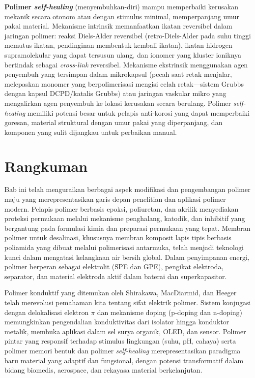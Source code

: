 \documentclass[12pt,a4paper,openany]{book}
\begin{document}
\textbf{Polimer \textit{self-healing}} (menyembuhkan-diri) mampu memperbaiki kerusakan mekanik secara otonom atau dengan stimulus minimal, memperpanjang umur pakai material. Mekanisme intrinsik memanfaatkan ikatan reversibel dalam jaringan polimer: reaksi Diels-Alder reversibel (retro-Diels-Alder pada suhu tinggi memutus ikatan, pendinginan membentuk kembali ikatan), ikatan hidrogen supramolekular yang dapat tersusun ulang, dan ionomer yang kluster ioniknya bertindak sebagai \textit{cross-link} reversibel. Mekanisme ekstrinsik menggunakan agen penyembuh yang tersimpan dalam mikrokapsul (pecah saat retak menjalar, melepaskan monomer yang berpolimerisasi mengisi celah retak---sistem Grubbs dengan kapsul DCPD/katalis Grubbs) atau jaringan vaskular mikro yang mengalirkan agen penyembuh ke lokasi kerusakan secara berulang. Polimer \textit{self-healing} memiliki potensi besar untuk pelapis anti-korosi yang dapat memperbaiki goresan, material struktural dengan umur pakai yang diperpanjang, dan komponen yang sulit dijangkau untuk perbaikan manual.

\section{Rangkuman}

Bab ini telah menguraikan berbagai aspek modifikasi dan pengembangan polimer maju yang merepresentasikan garis depan penelitian dan aplikasi polimer modern. Pelapis polimer berbasis epoksi, poliuretan, dan akrilik menyediakan proteksi permukaan melalui mekanisme penghalang, katodik, dan inhibitif yang bergantung pada formulasi kimia dan preparasi permukaan yang tepat. Membran polimer untuk desalinasi, khususnya membran komposit lapis tipis berbasis poliamida yang dibuat melalui polimerisasi antarmuka, telah menjadi teknologi kunci dalam mengatasi kelangkaan air bersih global. Dalam penyimpanan energi, polimer berperan sebagai elektrolit (SPE dan GPE), pengikat elektroda, separator, dan material elektroda aktif dalam baterai dan superkapasitor.

Polimer konduktif yang ditemukan oleh Shirakawa, MacDiarmid, dan Heeger telah merevolusi pemahaman kita tentang sifat elektrik polimer. Sistem konjugasi dengan delokalisasi elektron $\pi$ dan mekanisme doping (p-doping dan n-doping) memungkinkan pengendalian konduktivitas dari isolator hingga konduktor metalik, membuka aplikasi dalam sel surya organik, OLED, dan sensor. Polimer pintar yang responsif terhadap stimulus lingkungan (suhu, pH, cahaya) serta polimer memori bentuk dan polimer \textit{self-healing} merepresentasikan paradigma baru material yang adaptif dan fungsional, dengan potensi transformatif dalam bidang biomedis, aerospace, dan rekayasa material berkelanjutan.
\end{document}

